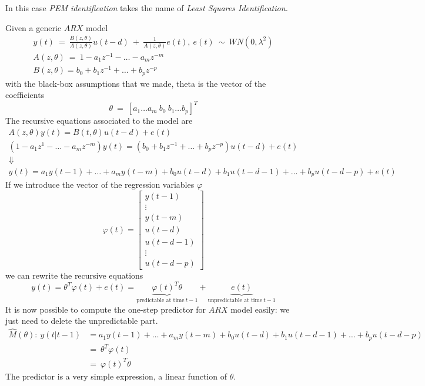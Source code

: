 In this case \textit{PEM identification} takes the name of \textit{Least Squares Identification. }

Given a generic $ ARX$ model
\begin{gather*}
y( t) \ =\ \frac{B( z,\theta )}{A( z,\theta )} u( t-d) \ +\ \frac{1}{A( z,\theta )} e( t) ,\ e( t) \ \sim \ WN\left( 0,\lambda ^{2}\right)\\
A( z,\theta ) \ =\ 1-a_{1} z^{-1} -\dotsc -a_{m} z^{-m}\\
B( z,\theta ) =b_{0} +b_{1} z^{-1} +\dotsc +b_{p} z^{-p}
\end{gather*}
with the black-box assumptions that we made, theta is the vector of the coefficients
\begin{equation*}
\theta \ =\ [ a_{1} \dotsc a_{m} \ b_{0} \ b_{1} \dotsc b_{p}]^{T}
\end{equation*}
The recursive equations associated to the model are
\begin{gather*}
A( z,\theta ) y( t) =B( t,\theta ) u( t-d) +e( t)\\
\left( 1-a_{1} z^{1} -\dotsc -a_{m} z^{-m}\right) y( t) =\left( b_{0} +b_{1} z^{-1} +\dotsc +b_{p} z^{-p}\right) u( t-d) +e( t)\\
\Downarrow \\
y( t) =a_{1} y( t-1) +\dotsc +a_{m} y( t-m) +b_{0} u( t-d) +b_{1} u( t-d-1) +\dotsc +b_{p} u( t-d-p) +e( t)
\end{gather*}
If we introduce the vector of the regression variables $ \varphi $
\begin{equation*}
\varphi ( t) =\begin{bmatrix}
y( t-1)\\
\vdots \\
y( t-m)\\
u( t-d)\\
u( t-d-1)\\
\vdots \\
u( t-d-p)
\end{bmatrix}
\end{equation*}
we can rewrite the recursive equations
\begin{equation*}
y( t) =\theta ^{T} \varphi ( t) +e( t) =\underbrace{\varphi ( t)^{T} \theta }_{\text{predictable at time} \ t-1} +\underbrace{e( t)}_{\text{unpredictable at time} \ t-1}
\end{equation*}
It is now possible to compute the one-step predictor for $ ARX$ model easily: we just need to delete the unpredictable part.
\begin{align*}
\hat{M}( \theta ) :\ \hat{y}( t|t-1) & =a_{1} y( t-1) +\dotsc +a_{m} y( t-m) +b_{0} u( t-d) +b_{1} u( t-d-1) +\dotsc +b_{p} u( t-d-p)\\
 & =\ \theta ^{T} \varphi ( t) \ \\
 & =\ \varphi ( t)^{T} \theta 
\end{align*}
The predictor is a very simple expression, a linear function of $ \theta $.

